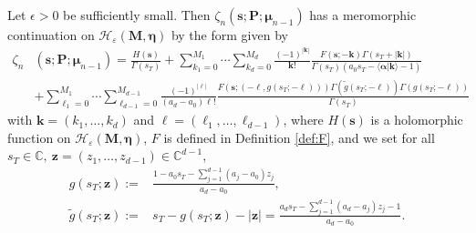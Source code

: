 \documentclass[10pt,a4paper]{amsart}
\begin{document}
\begin{thm}
\label{th:analytic_continuation_zeta_general_case}
Let $\epsilon>0$ be sufficiently small. Then $\zeta_{n}(\mathbf{s};\mathbf{P};\boldsymbol{\mu}_{n-1})$ has a meromorphic continuation on $\mathcal{H}_{\varepsilon}(\mathbf{M},\boldsymbol{\eta})$ by the form given by
\begin{align}
    \zeta_{n}&(\mathbf{s};\mathbf{P};\boldsymbol{\mu}_{n-1})= \frac{H(\mathbf{s})}{\Gamma(s_T)}+ \sum_{k_1=0}^{M_1} \cdots \sum_{k_d=0}^{M_d} \frac{(-1)^{|\mathbf{k}|}}{\mathbf{k}!} \frac{F(\mathbf{s};-\mathbf{k})\Gamma(s_T+|\mathbf{k}|)}{\Gamma(s_T)(a_0s_T-\langle \boldsymbol{\alpha}|\mathbf{k}\rangle-1)} \label{eq:analytic_continuation_zeta_general_case} \\ 
    & +\sum_{\ell_1=0}^{M_1} \cdots \sum_{\ell_{d-1}=0}^{M_{d-1}} \frac{(-1)^{|\boldsymbol{\ell}|}}{(a_d-a_0)\boldsymbol{\ell}!} \frac{F(\mathbf{s};(-\boldsymbol{\ell},g(s_T;-\boldsymbol{\ell})))\Gamma(\widetilde{g}(s_T;-\boldsymbol{\ell}))\Gamma(g(s_T;-\boldsymbol{\ell}))}{\Gamma(s_T)} \nonumber
\end{align}
with $\mathbf{k}=(k_1,\ldots,k_d)$ and
$\boldsymbol{\ell}=(\ell_1,\ldots,\ell_{d-1})$,
where $H(\mathbf{s})$ is a holomorphic function on $\mathcal{H}_{\varepsilon}(\mathbf{M},\boldsymbol{\eta})$, $F$ is defined in Definition \ref{def:F}, and we set for all $s_T \in \mathbb{C}, \ \mathbf{z}=(z_1,\ldots,z_{d-1}) \in \mathbb{C}^{d-1}$,
\begin{align*}
    g(s_T;\mathbf{z}):=& \frac{1-a_0s_T-\sum_{j=1}^{d-1} (a_j-a_0)z_j}{a_d-a_0}, \\
    \widetilde{g}(s_T;\mathbf{z}):=& s_T-g(s_T;\mathbf{z})-|\mathbf{z}| = \frac{a_ds_T-\sum_{j=1}^{d-1} (a_d-a_j)z_j-1}{a_d-a_0}.
\end{align*}
\end{thm}
\end{document}
